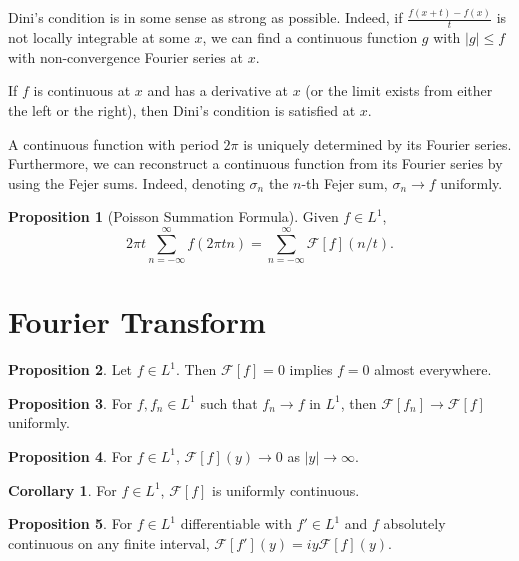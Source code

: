 \documentclass[]{article}
\theoremstyle{definition}
\newtheorem*{corollary}{Corollary}
\newtheorem*{proposition}{Proposition}
\begin{document}
Dini's condition is in some sense as strong as possible. Indeed, if 
\(\frac{f(x + t) - f(x)}{t}\) is not locally integrable at some \(x\), we can find 
a continuous function \(g\) with \(|g| \le f\) with non-convergence Fourier series 
at \(x\).

If \(f\) is continuous at \(x\) and has a derivative at \(x\) (or the limit exists 
from either the left or the right), then Dini's condition is satisfied at \(x\).

A continuous function with period \(2\pi\) is uniquely determined by its Fourier series. 
Furthermore, we can reconstruct a continuous function from its Fourier series by 
using the Fejer sums. Indeed, denoting \(\sigma_n\) the \(n\)-th Fejer sum, 
\(\sigma_n \to f\) uniformly.

\begin{proposition}[Poisson Summation Formula]
  Given \(f \in L^1\), 
  \[2\pi t \sum_{n = -\infty}^{\infty}f(2\pi t n) = \sum_{n = -\infty}^\infty \mathcal{F}[f](n / t).\]
\end{proposition}

\section*{Fourier Transform}

\begin{proposition}
  Let \(f \in L^1\). Then \(\mathcal{F}[f] = 0\) implies \(f = 0\) almost everywhere.
\end{proposition}

\begin{proposition}
  For \(f, f_n \in L^1\) such that \(f_n \to f\) in \(L^1\), then 
  \(\mathcal{F}[f_n] \to \mathcal{F}[f]\) uniformly.
\end{proposition}

\begin{proposition}
  For \(f \in L^1\), \(\mathcal{F}[f](y) \to 0\) as \(|y| \to \infty\).
\end{proposition}

\begin{corollary}
  For \(f \in L^1\), \(\mathcal{F}[f]\) is uniformly continuous.
\end{corollary}

\begin{proposition}
  For \(f \in L^1\) differentiable with \(f' \in L^1\) and \(f\) absolutely continuous 
  on any finite interval, \(\mathcal{F}[f'](y) = iy\mathcal{F}[f](y)\).
\end{proposition}
\end{document}
